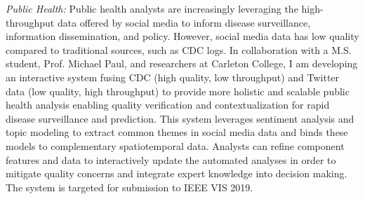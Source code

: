 \documentclass[11pt]{article}
\begin{document}
\emph{Public Health:} Public health analysts are increasingly leveraging the high-throughput data offered by social media to inform disease surveillance, information dissemination, and policy. However, social media data has low quality compared to traditional sources, such as CDC logs. In collaboration with a M.S. student, Prof. Michael Paul, and researchers at Carleton College, I am developing an interactive system fusing CDC (high quality, low throughput) and Twitter data (low quality, high throughput) to provide more holistic and scalable public health analysis enabling quality verification and contextualization for rapid disease surveillance and prediction. %
This system leverages sentiment analysis and topic modeling to extract common themes in social media data and binds these models to complementary spatiotemporal data. Analysts can refine component features and data to interactively update the automated analyses in order to mitigate quality concerns and integrate expert knowledge into decision making. The system is targeted for submission to IEEE VIS 2019.
\end{document}
